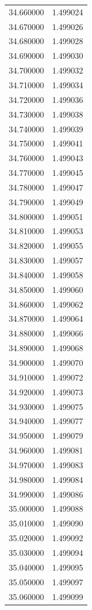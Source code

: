 \begin{tabular}{rr}
34.660000 & 1.499024 \\
34.670000 & 1.499026 \\
34.680000 & 1.499028 \\
34.690000 & 1.499030 \\
34.700000 & 1.499032 \\
34.710000 & 1.499034 \\
34.720000 & 1.499036 \\
34.730000 & 1.499038 \\
34.740000 & 1.499039 \\
34.750000 & 1.499041 \\
34.760000 & 1.499043 \\
34.770000 & 1.499045 \\
34.780000 & 1.499047 \\
34.790000 & 1.499049 \\
34.800000 & 1.499051 \\
34.810000 & 1.499053 \\
34.820000 & 1.499055 \\
34.830000 & 1.499057 \\
34.840000 & 1.499058 \\
34.850000 & 1.499060 \\
34.860000 & 1.499062 \\
34.870000 & 1.499064 \\
34.880000 & 1.499066 \\
34.890000 & 1.499068 \\
34.900000 & 1.499070 \\
34.910000 & 1.499072 \\
34.920000 & 1.499073 \\
34.930000 & 1.499075 \\
34.940000 & 1.499077 \\
34.950000 & 1.499079 \\
34.960000 & 1.499081 \\
34.970000 & 1.499083 \\
34.980000 & 1.499084 \\
34.990000 & 1.499086 \\
35.000000 & 1.499088 \\
35.010000 & 1.499090 \\
35.020000 & 1.499092 \\
35.030000 & 1.499094 \\
35.040000 & 1.499095 \\
35.050000 & 1.499097 \\
35.060000 & 1.499099 \\

\end{tabular}
